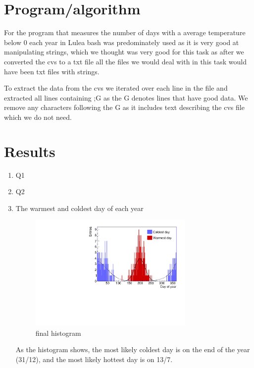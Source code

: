 \documentclass[a4paper]{article}
\begin{document}
\section{Program/algorithm}

For the program that measures the number of days with a average temperature below 0 each year in Lulea bash was predominately used as it is very good at manipulating strings,  which we thought was very good for this task as after we converted the cvs to a txt file all the files we would deal with in this task would have been txt files with strings.

To extract the data from the cvs we iterated over each line in the file and extracted all lines containing ;G as the G denotes lines that have good data. We remove any characters following the G as it includes text describing the cvs file which we do not need.  




\section{Results}
\begin{enumerate}
\item Q1
\item Q2
\item The warmest and coldest day of each year
\begin{figure}[htp]
    \centering
    \includegraphics[width=8cm]{./images/hotCold_Upp_final}
    \caption{final histogram}
    \label{fig:hist}
\end{figure}
As the histogram shows, the most likely coldest day is on the end of the year (31/12), and the most likely hottest day is on 13/7.

\end{enumerate}
\end{document}
